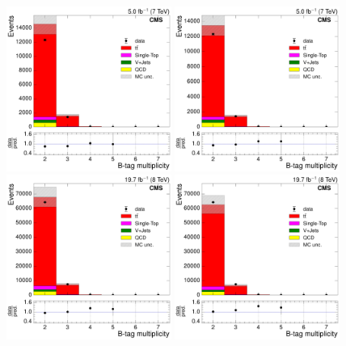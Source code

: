 \begin{figure}[hbtp]
    \centering
      \includegraphics[width=0.48\textwidth]{Chapters/04_Analysis/04b_XSections/images/control_plots/before_fit/7TeV/EPlusJets_N_BJets_with_ratio}\hfill
      \includegraphics[width=0.48\textwidth]{Chapters/04_Analysis/04b_XSections/images/control_plots/before_fit/7TeV/EPlusJets_N_BJets_reweighted_with_ratio}\\
      \includegraphics[width=0.48\textwidth]{Chapters/04_Analysis/04b_XSections/images/control_plots/before_fit/8TeV/EPlusJets_N_BJets_with_ratio}\hfill
      \includegraphics[width=0.48\textwidth]{Chapters/04_Analysis/04b_XSections/images/control_plots/before_fit/8TeV/EPlusJets_N_BJets_reweighted_with_ratio}\\

\end{figure}
